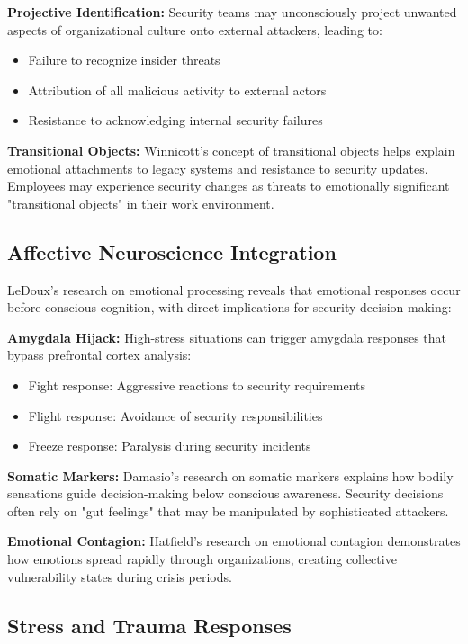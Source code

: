 \documentclass[11pt,a4paper]{article}
\begin{document}
\textbf{Projective Identification:}
Security teams may unconsciously project unwanted aspects of organizational culture onto external attackers, leading to:
\begin{itemize}
\item Failure to recognize insider threats
\item Attribution of all malicious activity to external actors
\item Resistance to acknowledging internal security failures
\end{itemize}

\textbf{Transitional Objects:}
Winnicott's concept of transitional objects\cite{winnicott1971} helps explain emotional attachments to legacy systems and resistance to security updates. Employees may experience security changes as threats to emotionally significant "transitional objects" in their work environment.

\subsection{Affective Neuroscience Integration}

LeDoux's research on emotional processing\cite{ledoux2000} reveals that emotional responses occur before conscious cognition, with direct implications for security decision-making:

\textbf{Amygdala Hijack:}
High-stress situations can trigger amygdala responses that bypass prefrontal cortex analysis:
\begin{itemize}
\item Fight response: Aggressive reactions to security requirements
\item Flight response: Avoidance of security responsibilities
\item Freeze response: Paralysis during security incidents
\end{itemize}

\textbf{Somatic Markers:}
Damasio's research\cite{damasio1994} on somatic markers explains how bodily sensations guide decision-making below conscious awareness. Security decisions often rely on "gut feelings" that may be manipulated by sophisticated attackers.

\textbf{Emotional Contagion:}
Hatfield's research on emotional contagion\cite{hatfield1994} demonstrates how emotions spread rapidly through organizations, creating collective vulnerability states during crisis periods.

\subsection{Stress and Trauma Responses}
\end{document}
